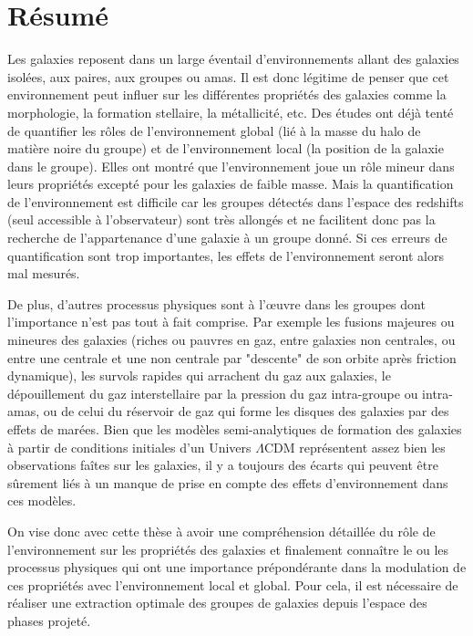 \chapter*{Résumé}
\label{cha:resume}

Les galaxies reposent dans un large éventail d'environnements allant des
galaxies isolées, aux paires, aux groupes ou amas. Il est donc légitime de
penser que cet environnement peut influer sur les différentes propriétés des
galaxies comme la morphologie, la formation stellaire, la métallicité, etc. Des
études ont déjà tenté de quantifier les rôles de l'environnement global (lié à
la masse du halo de matière noire du groupe) et de l'environnement local (la
position de la galaxie dans le groupe). Elles ont montré que l'environnement
joue un rôle mineur dans leurs propriétés excepté pour les galaxies de faible
masse. Mais la quantification de l'environnement est difficile car les groupes
détectés dans l'espace des redshifts (seul accessible à l'observateur) sont
très allongés et ne facilitent donc pas la recherche de l'appartenance d'une
galaxie à un groupe donné. Si ces erreurs de quantification sont trop
importantes, les effets de l'environnement seront alors mal mesurés.

De plus, d'autres processus physiques sont à l'œuvre dans les groupes dont
l'importance n'est pas tout à fait comprise. Par exemple les fusions majeures
ou mineures des galaxies (riches ou pauvres en gaz, entre galaxies non
centrales, ou entre une centrale et une non centrale par "descente" de son
orbite après friction dynamique), les survols rapides qui arrachent du gaz aux
galaxies, le dépouillement du gaz interstellaire par la pression du gaz
intra-groupe ou intra-amas, ou de celui du réservoir de gaz qui forme les
disques des galaxies par des effets de marées. Bien que les modèles
semi-analytiques de formation des galaxies à partir de conditions initiales
d'un Univers $\Lambda${CDM} représentent assez bien les observations faîtes sur
les galaxies, il y a toujours des écarts qui peuvent être sûrement liés à un
manque de prise en compte des effets d'environnement dans ces modèles.

On vise donc avec cette thèse à avoir une compréhension détaillée du rôle de
l'environnement sur les propriétés des galaxies et finalement connaître le ou
les processus physiques qui ont une importance prépondérante dans la modulation
de ces propriétés avec l'environnement local et global. Pour cela, il est
nécessaire de réaliser une extraction optimale des groupes de galaxies depuis
l'espace des phases projeté.


